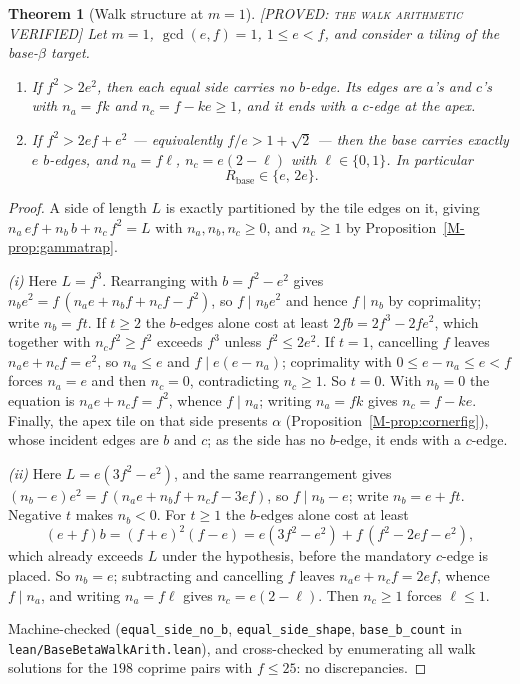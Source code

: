 \documentclass[11pt,reqno]{amsart}
\theoremstyle{plain}
\newtheorem{theorem}{Theorem}
\theoremstyle{definition}
\newcommand{\lab}[1]{\hfill\textnormal{\footnotesize\textsc{[#1]}}}
\begin{document}
\begin{theorem}[Walk structure at $m=1$]\label{thm:walkstruct}\lab{PROVED: the walk arithmetic VERIFIED}
Let $m=1$, $\gcd(e,f)=1$, $1\le e<f$, and consider a tiling of the base-$\beta$ target.
\begin{enumerate}
\item[\textup{(i)}] If $f^2>2e^2$, then each equal side carries \emph{no} $b$-edge. Its edges are
$a$'s and $c$'s with $n_a=fk$ and $n_c=f-ke\ge1$, and it ends with a $c$-edge at the apex.
\item[\textup{(ii)}] If $f^2>2ef+e^2$ --- equivalently $f/e>1+\sqrt2$ --- then the base carries
\emph{exactly} $e$ $b$-edges, and $n_a=f\ell$, $n_c=e(2-\ell)$ with $\ell\in\{0,1\}$. In particular
\[
R_{\mathrm{base}}\in\{e,\,2e\}.
\]
\end{enumerate}
\end{theorem}

\begin{proof}
A side of length $L$ is exactly partitioned by the tile edges on it, giving
$n_a\,ef+n_b\,b+n_c\,f^2=L$ with $n_a,n_b,n_c\ge0$, and $n_c\ge1$ by
Proposition~\ref{M-prop:gammatrap}.

\emph{(i)} Here $L=f^3$. Rearranging with $b=f^2-e^2$ gives
$n_b e^2=f\,(n_a e+n_b f+n_c f-f^2)$, so $f\mid n_b e^2$ and hence $f\mid n_b$ by coprimality;
write $n_b=ft$. If $t\ge2$ the $b$-edges alone cost at least $2fb=2f^3-2fe^2$, which together with
$n_cf^2\ge f^2$ exceeds $f^3$ unless $f^2\le2e^2$. If $t=1$, cancelling $f$ leaves
$n_ae+n_cf=e^2$, so $n_a\le e$ and $f\mid e(e-n_a)$; coprimality with $0\le e-n_a\le e<f$ forces
$n_a=e$ and then $n_c=0$, contradicting $n_c\ge1$. So $t=0$. With $n_b=0$ the equation is
$n_ae+n_cf=f^2$, whence $f\mid n_a$; writing $n_a=fk$ gives $n_c=f-ke$. Finally, the apex tile on
that side presents $\alpha$ (Proposition~\ref{M-prop:cornerfig}), whose incident edges are $b$ and
$c$; as the side has no $b$-edge, it ends with a $c$-edge.

\emph{(ii)} Here $L=e(3f^2-e^2)$, and the same rearrangement gives
$(n_b-e)e^2=f\,(n_ae+n_bf+n_cf-3ef)$, so $f\mid n_b-e$; write $n_b=e+ft$. Negative $t$ makes
$n_b<0$. For $t\ge1$ the $b$-edges alone cost at least
\[
(e+f)b=(f+e)^2(f-e)=e(3f^2-e^2)+f\,(f^2-2ef-e^2),
\]
which already exceeds $L$ under the hypothesis, before the mandatory $c$-edge is placed. So
$n_b=e$; subtracting and cancelling $f$ leaves $n_ae+n_cf=2ef$, whence $f\mid n_a$, and writing
$n_a=f\ell$ gives $n_c=e(2-\ell)$. Then $n_c\ge1$ forces $\ell\le1$.

Machine-checked (\texttt{equal\_side\_no\_b}, \texttt{equal\_side\_shape}, \texttt{base\_b\_count}
in \texttt{lean/BaseBetaWalkArith.lean}), and cross-checked by enumerating all walk solutions for
the $198$ coprime pairs with $f\le25$: no discrepancies.
\end{proof}
\end{document}
